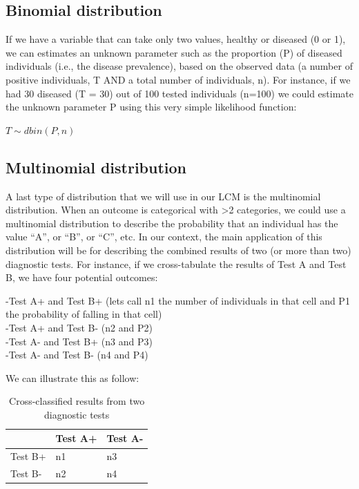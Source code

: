\documentclass[
]{book}
\begin{document}
\hypertarget{binomial-distribution}{%
\subsection{Binomial distribution}\label{binomial-distribution}}

If we have a variable that can take only two values, healthy or diseased
(0 or 1), we can estimates an unknown parameter such as the proportion
(P) of diseased individuals (i.e., the disease prevalence), based on the
observed data (a number of positive individuals, T AND a total number of
individuals, n). For instance, if we had 30 diseased (T = 30) out of 100
tested individuals (n=100) we could estimate the unknown parameter P
using this very simple likelihood function:

\(T \sim dbin(P, n)\)

\hypertarget{multinomial-distribution}{%
\subsection{Multinomial distribution}\label{multinomial-distribution}}

A last type of distribution that we will use in our LCM is the
multinomial distribution. When an outcome is categorical with
\textgreater2 categories, we could use a multinomial distribution to
describe the probability that an individual has the value ``A'', or
``B'', or ``C'', etc. In our context, the main application of this
distribution will be for describing the combined results of two (or more
than two) diagnostic tests. For instance, if we cross-tabulate the
results of Test A and Test B, we have four potential outcomes:

-Test A+ and Test B+ (lets call n1 the number of individuals in that
cell and P1 the probability of falling in that cell)\\
-Test A+ and Test B- (n2 and P2)\\
-Test A- and Test B+ (n3 and P3)\\
-Test A- and Test B- (n4 and P4)

We can illustrate this as follow:

\begin{table}

\caption{\label{tab:unnamed-chunk-10}Cross-classified results from two diagnostic tests}
\centering
\begin{tabular}[t]{l|l|l}
\hline
  & Test A+ & Test A-\\
\hline
Test B+ & n1 & n3\\
\hline
Test B- & n2 & n4\\
\hline
\end{tabular}
\end{table}
\end{document}
